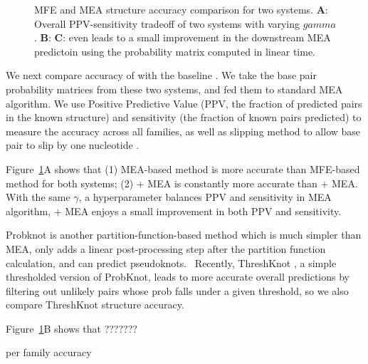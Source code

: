 \begin{figure}[t]
\begin{tabular}{ccc}
\end{tabular} %
\caption{MFE and MEA structure accuracy comparison for two systems.
	{\bf A}: Overall PPV-sensitivity tradeoff of two systems with varying $gamma$. 
	{\bf B}:
	{\bf C}:
	\linearpartition even leads to a small improvement in the downstream MEA predictoin using the probability matrix computed in linear time.
	\label{mea}
}
\end{figure}
\fi

We next compare accuracy of \linearpartition with the baseline \viennarnafold.
We take the base pair probability matrices from these two systems, 
and fed them to standard MEA algorithm.
We use Positive Predictive Value (PPV, the fraction of predicted pairs in the known structure) and sensitivity (the fraction of known pairs predicted) to measure the accuracy across all families, as well as slipping method to allow base pair to slip by one nucleotide \cite{sloma+mathews:2016}.


Figure~\ref{mea}A shows that 
(1) MEA-based method is more accurate than MFE-based method for both systems; 
(2) \linearpartition + MEA is constantly more accurate than \viennarnafold + MEA.
With the same $\gamma$, a hyperparameter balances PPV and sensitivity in MEA algorithm,
\linearpartition + MEA enjoys a small improvement in both PPV and sensitivity.


Probknot is another partition-function-based method which is much simpler than MEA, only adds a linear post-processing step after the partition function calculation, and can predict pseudoknots. 
Recently, ThreshKnot \cite{Liang+:2019}, a simple thresholded version of ProbKnot, 
leads to more accurate overall predictions by filtering out unlikely pairs whose prob falls under a given threshold,
so we also compare ThreshKnot structure accuracy.

Figure~\ref{mea}B shows that ???????

per family accuracy


